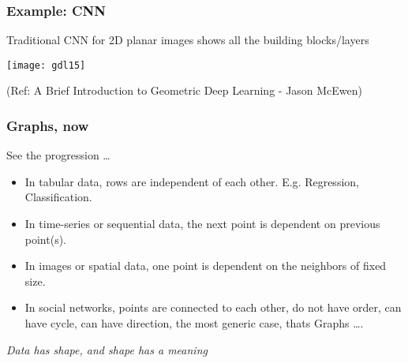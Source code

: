 \begin{frame}[fragile]\frametitle{Example: CNN}

Traditional CNN for 2D planar images shows all the building blocks/layers

\begin{center}
\texttt{[image: gdl15]}
\end{center}


{\tiny (Ref: A Brief Introduction to Geometric Deep Learning - Jason McEwen)}

\end{frame}


\begin{frame}[fragile]\frametitle{Graphs, now}

See the progression \ldots

\begin{itemize}
\item In tabular data, rows are independent of each other. E.g. Regression, Classification.
\item In time-series or sequential data, the next point is dependent on previous point(s).
\item In images or spatial data, one point is dependent on the neighbors of fixed size.
\item In social networks, points are connected to each other, do not have order, can have cycle, can have direction, the most generic case, thats Graphs \ldots.
\end{itemize}
	
	{\em Data has shape, and shape has a meaning}
	
\end{frame}




